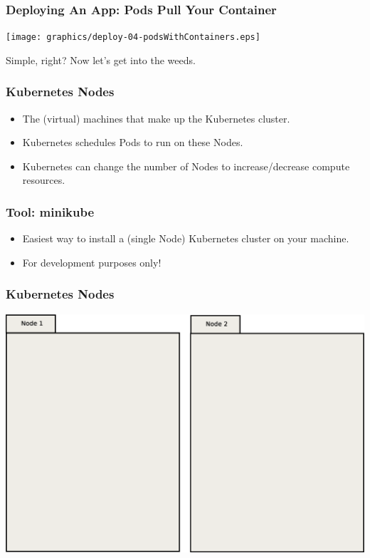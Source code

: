     \begin{frame}
        \frametitle{Deploying An App: Pods Pull Your Container}
        \texttt{[image: graphics/deploy-04-podsWithContainers.eps]}
    \end{frame}

    \begin{frame}
        \begin{center}
            \Huge Simple, right? Now let's get into the weeds.
        \end{center}
    \end{frame}

    \begin{frame}
        \frametitle{Kubernetes Nodes}
        \begin{itemize}
            \item The (virtual) machines that make up the Kubernetes cluster.\pause
            \item Kubernetes schedules Pods to run on these Nodes.\pause
            \item Kubernetes can change the number of Nodes to increase/decrease compute resources.
        \end{itemize}
    \end{frame}

    \begin{frame}
        \frametitle{Tool: minikube\footnotemark}
        \begin{itemize}
            \item Easiest way to install a (single Node) Kubernetes cluster on your machine.
            \item For development purposes only!
        \end{itemize}
    \end{frame}

    \begin{frame}
        \frametitle{Kubernetes Nodes}
        \includegraphics[width=\textwidth,height=0.85\textheight,keepaspectratio]{graphics/00-nodes.eps}
    \end{frame}

